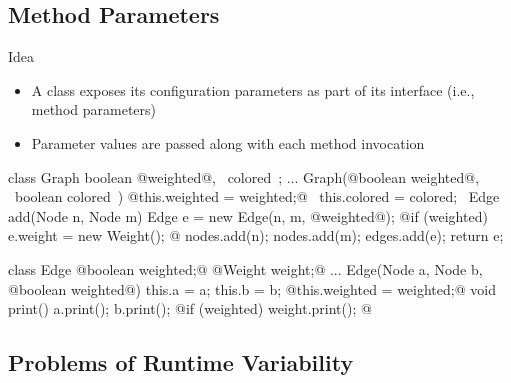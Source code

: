 \subsection{Method Parameters}
\begin{frame}[fragile]{\myframetitle}
	\begin{mycolumns}[t]
		\begin{definition}{Idea}
			\begin{itemize}
				\item A class exposes its configuration parameters as part of its interface (i.e., method parameters)
				\item Parameter values are passed along with each method invocation
			\end{itemize}
		\end{definition}
		\small
\begin{codetight}{}
class Graph {
	boolean @weighted@, ~colored~;
	...
	Graph(@boolean weighted@, ~boolean colored~) {
		@this.weighted = weighted;@ ~this.colored = colored;~
	}
	Edge add(Node n, Node m) {
		Edge e = new Edge(n, m, @weighted@);
		@if (weighted) { e.weight = new Weight(); }@
		nodes.add(n); nodes.add(m); edges.add(e);
		return e;
	}
}
\end{codetight}
	\mynextcolumn
	\small
\begin{codetight}{}
class Edge {
	@boolean weighted;@
	@Weight weight;@
	...
	Edge(Node a, Node b, @boolean weighted@) {
		this.a = a; this.b = b;
		@this.weighted = weighted;@
	}
	void print() {
		a.print(); b.print();
		@if (weighted) { weight.print(); }@
	}
}
\end{codetight}
		\normalsize
	\end{mycolumns}
\end{frame}


\subsection{Problems of Runtime Variability}


